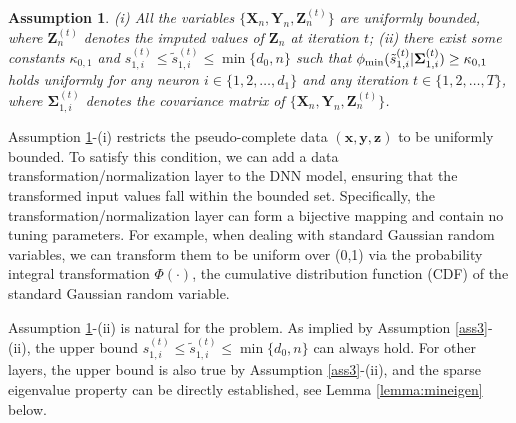 \documentclass[11pt]{article}
\newcommand{\bX}{{\boldsymbol X}}
\newcommand{\bY}{{\boldsymbol Y}}
\newcommand{\by}{{\boldsymbol y}}
\newcommand{\bx}{{\boldsymbol x}}
\newcommand{\bz}{{\boldsymbol z}}
\newcommand{\bZ}{{\boldsymbol Z}}
\newcommand{\btheta}{{\boldsymbol \theta}}
\newcommand{\bSigma}{{\boldsymbol \Sigma}}
\newtheorem{assumption}{Assumption}
\begin{document}
\begin{assumption} \label{ass4} 
 (i) All the variables $\{\bX_n,\bY_n,\bZ_n^{(t)}\}$ are uniformly bounded, where $\bZ_n^{(t)}$ denotes the imputed values of $\bZ_n$ at iteration $t$; 
(ii) there exist some constants $\kappa_{0,1}$ and 
$s_{1,i}^{(t)} \leq \tilde{s}_{1,i}^{(t)} \leq \min\{d_{0},n\}$ 
such that $\phi_{\rm \min}(\tilde{s}_{1,i}^{(t)}|\bSigma_{1,i}^{(t)}) \geq \kappa_{0,1}$ holds uniformly for any neuron $i \in\{1,2,\ldots,d_1\}$ and any  
iteration $t\in \{1,2,\ldots,T\}$, where $\bSigma_{1,i}^{(t)}$ denotes the covariance matrix of $\{\bX_n,\bY_n,\bZ_n^{(t)}\}$.
\end{assumption}

Assumption \ref{ass4}-(i) restricts the pseudo-complete data $(\bx, \by, \bz)$ to be 
uniformly bounded. To satisfy this condition, we can add a data transformation/normalization layer to the DNN model, ensuring that the transformed input values fall within the bounded set.
Specifically, the transformation/normalization layer can form a bijective mapping and contain no tuning parameters. For example, when dealing with standard Gaussian random variables, we can transform them to be uniform over (0,1) via the probability integral transformation $\Phi(\cdot)$, the cumulative distribution function (CDF) of the standard Gaussian random variable.  


Assumption \ref{ass4}-(ii) is natural for the problem. As implied by Assumption \ref{ass3}-(ii), the upper bound $s_{1,i}^{(t)} \leq \tilde{s}_{1,i}^{(t)} \leq \min\{d_{0},n\}$ 
can always hold. For other layers, the upper bound is also true by Assumption \ref{ass3}-(ii), and the sparse eigenvalue property can be directly established, see Lemma \ref{lemma:mineigen} below. 
\end{document}
